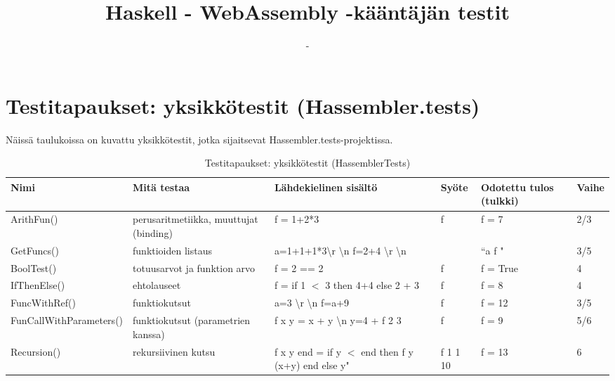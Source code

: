 \documentclass[11pt]{article} %
\title{Haskell - WebAssembly -kääntäjän testit}
\author{-}
\begin{document}
\maketitle


\section{Testitapaukset: yksikkötestit (Hassembler.tests)}

Näissä taulukoissa on kuvattu yksikkötestit, jotka sijaitsevat Hassembler.tests-projektissa.

\begin{table}[!htbp] %
\caption{Testitapaukset: yksikkötestit (HassemblerTests)}
\begin{tabular}{|p{3cm}|p{}|p{3cm}|p{}|p{3cm}|p{}|}
\hline
\textbf{Nimi} & \textbf{Mitä testaa} & \textbf{Lähdekielinen sisältö} & \textbf{Syöte}& \textbf{Odotettu tulos (tulkki)}  & \textbf{Vaihe} \\ \hline
 ArithFun()             & perus\-aritmetiikka, muuttujat (binding)         & f = 1+2*3  & f  & f = 7                                  &  2/3              \\ \hline
 GetFuncs()             & funktioiden listaus   & a=1+1+1*3\textbackslash r \textbackslash n f=2+4 \textbackslash r \textbackslash n &  &  ``a f "         &   3/5          \\ \hline
 BoolTest()    & totuusarvot ja funktion arvo  & f = 2 == 2   & f & f = True         & 4    \\ \hline
 IfThenElse()    & ehtolauseet                & f = if 1 $<$ 3 then 4+4 else 2 + 3   & f & f = 8         & 4    \\ \hline
 FuncWithRef()  & funktiokutsut      &   a=3 \textbackslash r \textbackslash n f=a+9          &  f         & f = 12   & 3/5                                        \\ \hline
 FunCallWith\-Parameters()   &  funktiokutsut (parametrien kanssa)  &  f x y = x + y \textbackslash n   y=4 + f 2 3 &      f & f = 9        &  5/6             \\ \hline
 Recursion()   & rekursiivinen kutsu      &  f x y end = if y $<$ end then f y (x+y) end else y"    & f 1 1 10  & f = 13         & 6         \\ \hline
\end{tabular}
\end{table}
\end{document}
